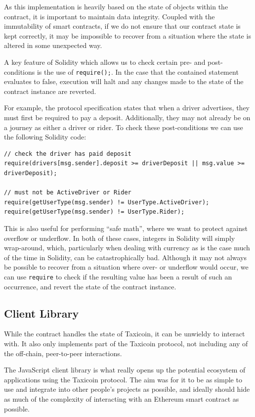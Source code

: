 As this implementation is heavily based on the state of objects within the contract, it is important to maintain data integrity. Coupled with the immutability of smart contracts, if we do not ensure that our contract state is kept correctly, it may be impossible to recover from a situation where the state is altered in some unexpected way.

A key feature of Solidity which allows us to check certain pre- and post-conditions is the use of \lstinline{require();}. In the case that the contained statement evaluates to false, execution will halt and any changes made to the state of the contract instance are reverted.

For example, the protocol specification states that when a driver advertises, they must first be required to pay a deposit. Additionally, they may not already be on a journey as either a driver or rider. To check these post-conditions we can use the following Solidity code:

\begin{lstlisting}[language=Solidity]
// check the driver has paid deposit
require(drivers[msg.sender].deposit >= driverDeposit || msg.value >= driverDeposit);

// must not be ActiveDriver or Rider
require(getUserType(msg.sender) != UserType.ActiveDriver);
require(getUserType(msg.sender) != UserType.Rider);
\end{lstlisting}

This is also useful for performing \enquote{safe math}, where we want to protect against overflow or underflow. In both of these cases, integers in Solidity will simply wrap-around, which, particularly when dealing with currency as is the case much of the time in Solidity, can be catastrophically bad. Although it may not always be possible to recover from a situation where over- or underflow would occur, we can use \lstinline{require} to check if the resulting value has been a result of such an occurrence, and revert the state of the contract instance.

\subsection{Client Library}

While the contract handles the state of Taxicoin, it can be unwieldy to interact with. It also only implements part of the Taxicoin protocol, not including any of the off-chain, peer-to-peer interactions.

The JavaScript client library is what really opens up the potential ecosystem of applications using the Taxicoin protocol. The aim was for it to be as simple to use and integrate into other people's projects as possible, and ideally should hide as much of the complexity of interacting with an Ethereum smart contract as possible.

